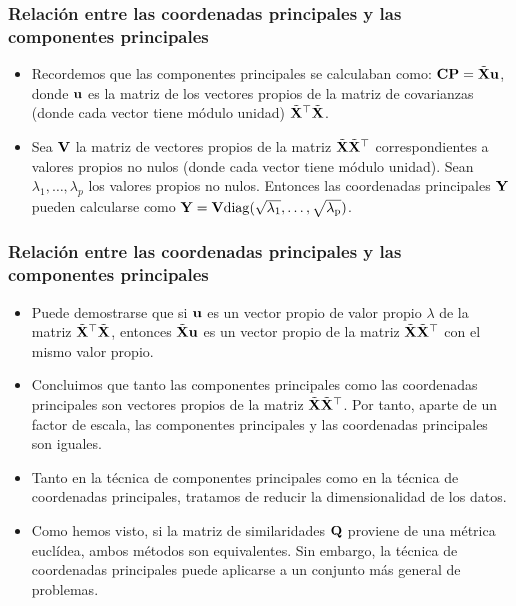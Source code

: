 \begin{frame}
\frametitle{Relación entre las coordenadas principales y las componentes principales}
\begin{itemize}
\item<2->{Recordemos que las componentes principales se calculaban como: $\mathbf{CP}=\tilde{\mathbf{X}}\mathbf{u}$, donde $\mathbf{u}$ es la matriz de los vectores propios de la matriz de covarianzas (donde cada vector tiene módulo unidad) $\tilde{\mathbf{X}}^\top\tilde{\mathbf{X}}$.}
\item<3->{Sea $\mathbf{V}$ la matriz de vectores propios de la matriz $\tilde{\mathbf{X}}\tilde{\mathbf{X}}^\top$ correspondientes a valores propios no nulos (donde cada vector tiene módulo unidad). Sean $\lambda_1,\ldots,\lambda_p$ los valores propios no nulos. Entonces las coordenadas principales $\mathbf{Y}$ pueden calcularse como $\mathbf{Y}=\mathbf{V}\rm{diag}(\sqrt{\lambda_1},\ldots,\sqrt{\lambda_p})$. }
\end{itemize}
\end{frame}
\begin{frame}
\frametitle{Relación entre las coordenadas principales y las componentes principales}
\begin{itemize}
\item<2->{Puede demostrarse que si $\mathbf{u}$ es un vector propio de valor propio $\lambda$ de la matriz $\tilde{\mathbf{X}}^\top\tilde{\mathbf{X}}$, entonces $\tilde{\mathbf{X}}\mathbf{u}$ es un vector propio de la matriz $\tilde{\mathbf{X}}\tilde{\mathbf{X}}^\top$ con el mismo valor propio.}
\item<3->{Concluimos que tanto las componentes principales como las coordenadas principales son vectores propios de la matriz $\tilde{\mathbf{X}}\tilde{\mathbf{X}}^\top$. Por tanto, aparte de un factor de escala, las componentes principales y las coordenadas principales son iguales.}
\item<4->{Tanto en la técnica de componentes principales como en la técnica de coordenadas principales, tratamos de reducir la dimensionalidad de los datos.}
\item<5->{Como hemos visto, si la matriz de similaridades $\mathbf{Q}$ proviene de una métrica euclídea, ambos métodos son equivalentes. Sin embargo, la técnica de coordenadas principales puede aplicarse a un conjunto más general de problemas.}
\end{itemize}
\end{frame}

